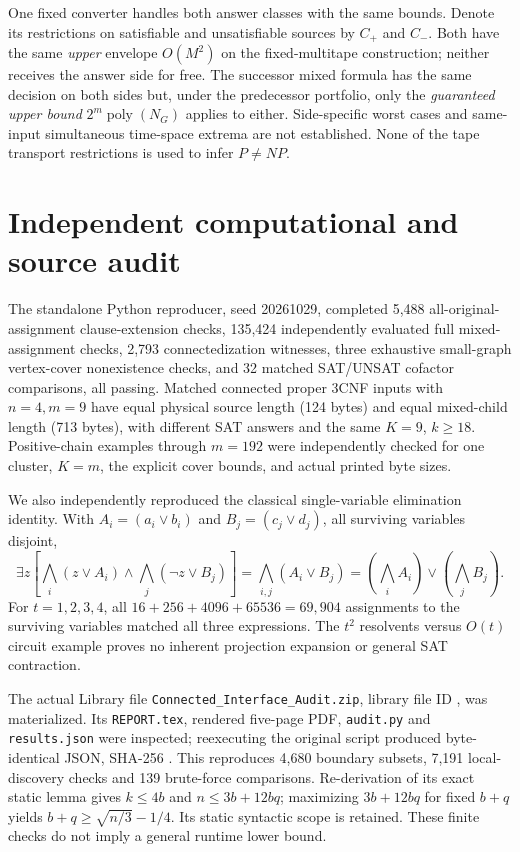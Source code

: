 \documentclass[11pt]{article}
\newcommand{\poly}{\operatorname{poly}}
\begin{document}
One fixed converter handles both answer classes with the same bounds. Denote its restrictions on satisfiable and unsatisfiable sources by $C_+$ and $C_-$. Both have the same \emph{upper} envelope $O(M^2)$ on the fixed-multitape construction; neither receives the answer side for free. The successor mixed formula has the same decision on both sides but, under the predecessor portfolio, only the \emph{guaranteed upper bound} $2^m\poly(N_G)$ applies to either. Side-specific worst cases and same-input simultaneous time-space extrema are not established. None of the tape transport restrictions is used to infer $P\ne NP$.

\section{Independent computational and source audit}
The standalone Python reproducer, seed 20261029, completed 5,488 all-original-assignment clause-extension checks, 135,424 independently evaluated full mixed-assignment checks, 2,793 connectedization witnesses, three exhaustive small-graph vertex-cover nonexistence checks, and 32 matched SAT/UNSAT cofactor comparisons, all passing. Matched connected proper 3CNF inputs with $n=4,m=9$ have equal physical source length (124 bytes) and equal mixed-child length (713 bytes), with different SAT answers and the same $K=9$, $k\ge18$. Positive-chain examples through $m=192$ were independently checked for one cluster, $K=m$, the explicit cover bounds, and actual printed byte sizes.

We also independently reproduced the classical single-variable elimination identity. With $A_i=(a_i\lor b_i)$ and $B_j=(c_j\lor d_j)$, all surviving variables disjoint,
\[
\exists z\left[\bigwedge_i(z\lor A_i)\land\bigwedge_j(\neg z\lor B_j)\right]
=\bigwedge_{i,j}(A_i\lor B_j)
=\left(\bigwedge_iA_i\right)\lor\left(\bigwedge_jB_j\right).
\]
For $t=1,2,3,4$, all $16+256+4096+65536=69{,}904$ assignments to the surviving variables matched all three expressions. The $t^2$ resolvents versus $O(t)$ circuit example proves no inherent projection expansion or general SAT contraction.

The actual Library file \texttt{Connected\_Interface\_Audit.zip}, library file ID \texttt{}, was materialized. Its \texttt{REPORT.tex}, rendered five-page PDF, \texttt{audit.py} and \texttt{results.json} were inspected; reexecuting the original script produced byte-identical JSON, SHA-256 \texttt{}. This reproduces 4,680 boundary subsets, 7,191 local-discovery checks and 139 brute-force comparisons. Re-derivation of its exact static lemma gives $k\le4b$ and $n\le3b+12bq$; maximizing $3b+12bq$ for fixed $b+q$ yields $b+q\ge\sqrt{n/3}-1/4$. Its static syntactic scope is retained. These finite checks do not imply a general runtime lower bound.
\end{document}
